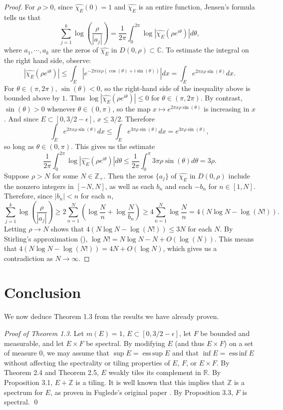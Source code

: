\documentclass{amsart}
\DeclareMathOperator{\essinf}{ess\, inf}
\DeclareMathOperator{\esssup}{ess\,sup}
\begin{document}
\begin{proof}
For $\rho>0$, since $\hat{\chi_E}(0)=1$ and $\hat{\chi_E}$ is an entire function, Jensen's formula tells us that
$$\sum_{j=1}^k\log\left(\frac{\rho}{|a_j|}\right)=\frac{1}{2\pi}\int_0^{2\pi}\log|\hat{\chi_E}(\rho e^{i\theta})|d\theta,$$
where $a_1,\cdots,a_k$ are the zeros of $\hat{\chi_E}$ in $D(0,\rho)\subset\mathbb{C}$. To estimate the integral on the right hand side, observe:
$$|\hat{\chi_E}(\rho e^{i\theta})|\leq\int_E|e^{-2\pi i x\rho(\cos(\theta)+i\sin(\theta))}|dx=\int_E e^{2\pi x\rho\sin(\theta)}dx.$$
For $\theta\in (\pi,2\pi)$, $\sin(\theta)<0$, so the right-hand side of the inequality above is bounded above by $1$. Thus $\log|\hat{\chi_E}(\rho e^{i\theta})|\leq 0$ for $\theta\in (\pi,2\pi)$. By contrast, $\sin(\theta)> 0$ 
whenever $\theta\in (0,\pi)$, so the map $x\mapsto e^{2\pi x\rho\sin(\theta)}$ is increasing in $x$. And since $E\subset [0,3/2-\epsilon]$, $x\leq 3/2$. Therefore
$$\int_E e^{2\pi  x\rho\sin(\theta)}dx\leq\int_E e^{3\pi\rho\sin(\theta)}dx=e^{3\pi\rho\sin(\theta)},$$
so long as $\theta\in (0,\pi)$. This gives us the estimate
$$\frac{1}{2\pi}\int_0^{2\pi}\log|\hat{\chi_E}(\rho e^{i\theta})|d\theta\leq \frac{1}{2\pi}\int_0^\pi 3\pi\rho\sin(\theta)d\theta=3\rho.$$
Suppose $\rho>N$ for some $N\in\mathbb{Z}_+$. Then the zeros $\{a_j\}$ of $\hat{\chi_E}$ in $D(0,\rho)$ include the nonzero integers in $[-N,N]$, as well as each $b_n$ and each $-b_n$ for $n\in [1,N]$. Therefore, since $|b_n|<n$ for each $n$,
$$\sum_{j=1}^k\log\left(\frac{\rho}{|a_j|}\right)\ge 2\sum_{n=1}^N\left(\log\frac{N}{n}+\log\frac{N}{b_n}\right)\ge 4\sum_{n=1}^N\log\frac{N}{n}=4(N\log N-\log (N!)).$$
Letting $\rho\to N$ shows that $4(N\log N-\log(N!))\leq 3N$ for each $N$. By Stirling's approximation (\cite{Ahlfors1978}), $\log N!=N\log N-N+O(\log(N))$. This means that $4(N\log N-\log(N!))=4N+O(\log N)$, which gives us a contradiction as $N\to\infty$. \end{proof}

\section{Conclusion}\label{s:argument}

We now deduce Theorem 1.3 from the results we have already proven.

\noindent\emph{Proof of Theorem 1.3.}
    Let $m(E)=1$, $E\subset [0, 3/2-\epsilon]$, let $F$ be bounded and measurable, and let $E\times F$ be spectral. By modifying $E$ (and thus $E\times F$) on a set of measure $0$, we may assume that $\sup E=\esssup E$ and that $\inf E=\essinf E$ without affecting the spectrality or tiling properties of $E$, $F$, or $E\times F$. By Theorem 2.4 and Theorem 2.5, $E$ weakly tiles its complement in $\mathbb{R}$. By Proposition 3.1, $E+\mathbb{Z}$ is a tiling. It is well known that this implies that $\mathbb{Z}$ is a spectrum for $E$, as proven in Fuglede's original paper \cite{Fug74}. By Proposition 3.3, $F$ is spectral. \qed
\end{document}
